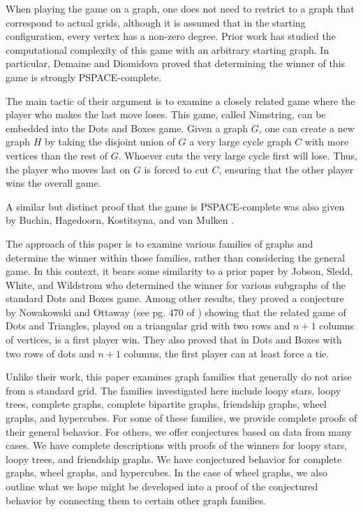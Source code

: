 \documentclass{article}
\begin{document}
When playing the game on a graph, one does not need to restrict to a graph that correspond to actual grids, although it is assumed that in the starting configuration, every vertex has a non-zero degree. Prior work has studied the computational complexity of this game with an arbitrary starting graph. In particular, Demaine and Diomidova \cite{DD} proved that determining the winner of this game is strongly PSPACE-complete.

The main tactic of their argument is to examine a closely related game where the player who makes the last move loses. This game, called Nimstring, can be embedded into the Dots and Boxes game. Given a graph $G$, one can create a new graph $H$ by taking the disjoint union of $G$ a very large cycle graph $C$ with more vertices than the rest of $G$. Whoever cuts the very large cycle first will lose. Thus, the player who moves last on $G$ is forced to cut $C$, ensuring that the other player wins the overall game. 

A similar but distinct proof that the game is PSPACE-complete was also given by Buchin, Hagedoorn, Kostitsyna, and van Mulken \cite{BHKM}.

The approach of this paper is to examine various families of graphs and determine the winner within those families, rather than considering the general game. In this context, it bears some similarity to a prior paper by Jobson, Sledd, White, and Wildstrom \cite{JSWW} who determined the winner for various subgraphs of the standard Dots and Boxes game. Among other results, they proved a conjecture by Nowakowski and Ottaway (see pg. 470 of \cite{Nowakowski}) showing that the related game of Dots and Triangles, played on a triangular grid with two rows and $n+1$ columns of vertices, is a first player win. They also proved that in Dots and Boxes with two rows of dots and $n+1$ columns, the first player can at least force a tie.

Unlike their work, this paper examines graph families that generally do not arise from a standard grid. The families investigated here include loopy stars, loopy trees, complete graphs, complete bipartite graphs, friendship graphs, wheel graphs, and hypercubes. For some of these families, we provide complete proofs of their general behavior. For others, we offer conjectures based on data from many cases. We have complete descriptions with proofs of the winners for loopy stars, loopy trees, and friendship graphs. We have conjectured behavior for complete graphs, wheel graphs, and hypercubes. In the case of wheel graphs, we also outline what we hope might be developed into a proof of the conjectured behavior by connecting them to certain other graph families.
\end{document}
